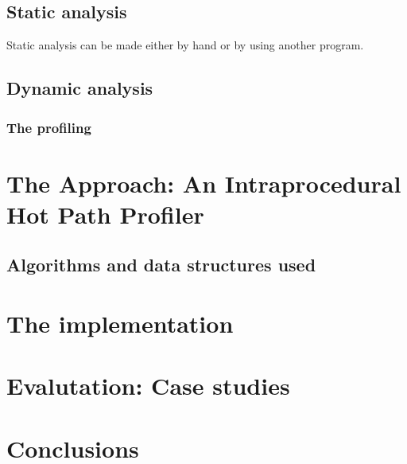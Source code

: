 \documentclass[a4paper,11pt]{report}
\begin{document}
\section{Static analysis}

Static analysis can be made either by hand or by using another program.


\section{Dynamic analysis}

\subsection{The profiling}



\chapter{The Approach: An Intraprocedural Hot Path Profiler}


\section{Algorithms and data structures used}

\chapter{The implementation}


\chapter{Evalutation: Case studies}


\chapter{Conclusions}
\end{document}
